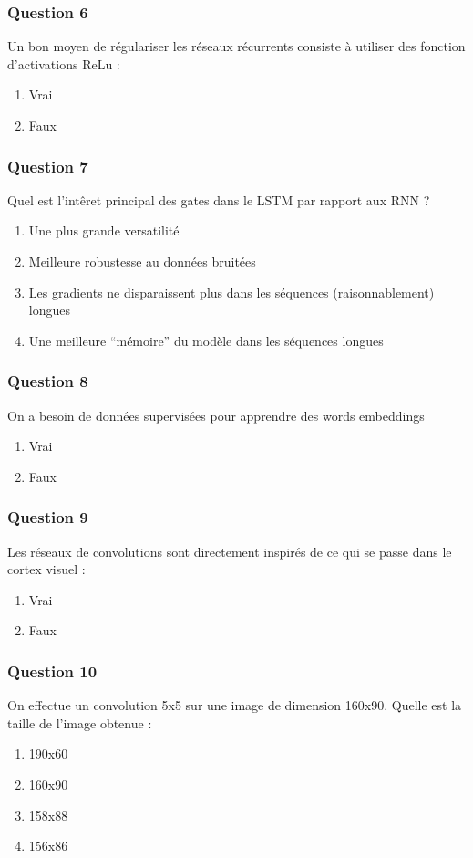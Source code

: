 \documentclass{formation}
\begin{document}
\begin{frame}
  \frametitle{Question 6}
  Un bon moyen de régulariser les réseaux récurrents consiste à utiliser des fonction d'activations ReLu :
  \begin{enumerate}
  \item Vrai
  \item Faux
  \end{enumerate}
\end{frame}

\begin{frame}
  \frametitle{Question 7}
  Quel est l'intêret principal des gates dans le LSTM par rapport aux RNN ?
  \begin{enumerate}
  \item Une plus grande versatilité
  \item Meilleure robustesse au données bruitées
  \item Les gradients ne disparaissent plus dans les séquences (raisonnablement) longues
  \item Une meilleure ``mémoire'' du modèle dans les séquences longues
  \end{enumerate}
\end{frame}

\begin{frame}
  \frametitle{Question 8}
  On a besoin de données supervisées pour apprendre des words embeddings
  \begin{enumerate}
  \item Vrai
  \item Faux
  \end{enumerate}
\end{frame}

\begin{frame}
  \frametitle{Question 9}
  Les réseaux de convolutions sont directement inspirés de ce qui se passe dans le cortex visuel :
  \begin{enumerate}
  \item Vrai
  \item Faux
  \end{enumerate}
\end{frame}

\begin{frame}
  \frametitle{Question 10}
  On effectue un convolution 5x5 sur une image de dimension 160x90. Quelle est la taille de l'image obtenue :
  \begin{enumerate}
  \item 190x60
  \item 160x90
  \item 158x88
  \item 156x86
  \end{enumerate}
\end{frame}
\end{document}
